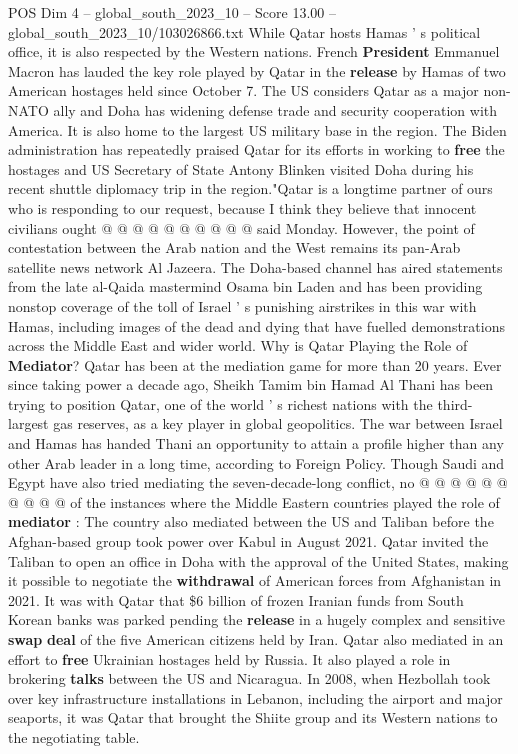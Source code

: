 \begin{textsample}{POS Dim 4 – global\_south\_2023\_10 – Score 13.00 – global\_south\_2023\_10/103026866.txt}
While Qatar hosts Hamas ' s political office, it is also respected by the Western nations.
French \textbf{President} Emmanuel Macron has lauded the key role played by Qatar in the \textbf{release} by Hamas of two American hostages held since October 7.
The US considers Qatar as a major non-NATO ally and Doha has widening defense trade and security cooperation with America.
It is also home to the largest US military base in the region.
The Biden administration has repeatedly praised Qatar for its efforts in working to \textbf{free} the hostages and US Secretary of State Antony Blinken visited Doha during his recent shuttle diplomacy trip in the region."Qatar is a longtime partner of ours who is responding to our request, because I think they believe that innocent civilians ought @ @ @ @ @ @ @ @ @ @ said Monday.
However, the point of contestation between the Arab nation and the West remains its pan-Arab satellite news network Al Jazeera.
The Doha-based channel has aired statements from the late al-Qaida mastermind Osama bin Laden and has been providing nonstop coverage of the toll of Israel ' s punishing airstrikes in this war with Hamas, including images of the dead and dying that have fuelled demonstrations across the Middle East and wider world.
Why is Qatar Playing the Role of \textbf{Mediator}?
Qatar has been at the mediation game for more than 20 years.
Ever since taking power a decade ago, Sheikh Tamim bin Hamad Al Thani has been trying to position Qatar, one of the world ' s richest nations with the third-largest gas reserves, as a key player in global geopolitics.
The war between Israel and Hamas has handed Thani an opportunity to attain a profile higher than any other Arab leader in a long time, according to Foreign Policy.
Though Saudi and Egypt have also tried mediating the seven-decade-long conflict, no @ @ @ @ @ @ @ @ @ @ of the instances where the Middle Eastern countries played the role of \textbf{mediator} : The country also mediated between the US and Taliban before the Afghan-based group took power over Kabul in August 2021.
Qatar invited the Taliban to open an office in Doha with the approval of the United States, making it possible to negotiate the \textbf{withdrawal} of American forces from Afghanistan in 2021.
It was with Qatar that \$6 billion of frozen Iranian funds from South Korean banks was parked pending the \textbf{release} in a hugely complex and sensitive \textbf{swap} \textbf{deal} of the five American citizens held by Iran.
Qatar also mediated in an effort to \textbf{free} Ukrainian hostages held by Russia.
It also played a role in brokering \textbf{talks} between the US and Nicaragua.
In 2008, when Hezbollah took over key infrastructure installations in Lebanon, including the airport and major seaports, it was Qatar that brought the Shiite group and its Western nations to the negotiating table.

\end{textsample}
